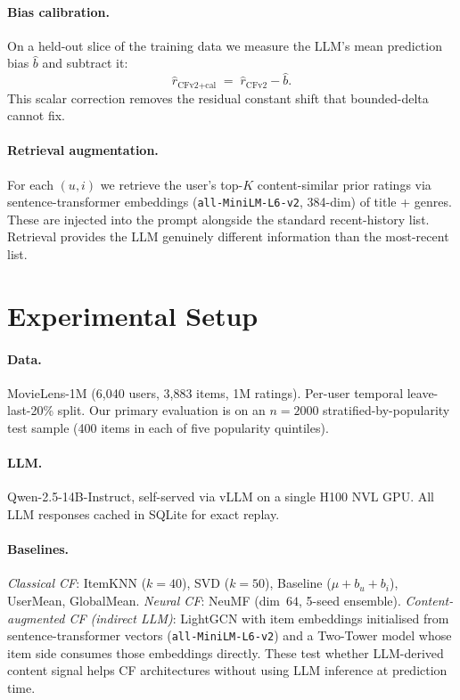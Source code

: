 \documentclass[11pt,a4paper]{article}
\begin{document}
\paragraph{Bias calibration.}
On a held-out slice of the training data we measure the LLM's mean
prediction bias $\hat b$ and subtract it:
\[
  \hat{r}_{\text{CFv2+cal}} \;=\; \hat{r}_{\text{CFv2}} - \hat b.
\]
This scalar correction removes the residual constant shift that
bounded-delta cannot fix.

\paragraph{Retrieval augmentation.}
For each $(u,i)$ we retrieve the user's top-$K$ content-similar prior
ratings via sentence-transformer embeddings (\texttt{all-MiniLM-L6-v2},
384-dim) of title + genres. These are injected into the prompt alongside
the standard recent-history list. Retrieval provides the LLM genuinely
different information than the most-recent list.

\section{Experimental Setup}

\paragraph{Data.} MovieLens-1M (6{,}040 users, 3{,}883 items, 1M ratings).
Per-user temporal leave-last-20\% split. Our primary evaluation is on an
$n{=}2000$ stratified-by-popularity test sample (400 items in each of
five popularity quintiles).

\paragraph{LLM.} Qwen-2.5-14B-Instruct, self-served via vLLM on a single
H100 NVL GPU. All LLM responses cached in SQLite for exact replay.

\paragraph{Baselines.}
\emph{Classical CF}: ItemKNN ($k{=}40$), SVD ($k{=}50$),
Baseline ($\mu{+}b_u{+}b_i$), UserMean, GlobalMean.
\emph{Neural CF}: NeuMF (dim~$64$, 5-seed ensemble).
\emph{Content-augmented CF (indirect LLM)}: LightGCN with item
embeddings initialised from sentence-transformer vectors
(\texttt{all-MiniLM-L6-v2}) and a Two-Tower model whose item side consumes
those embeddings directly. These test whether LLM-derived content signal
helps CF architectures without using LLM inference at prediction time.
\end{document}
